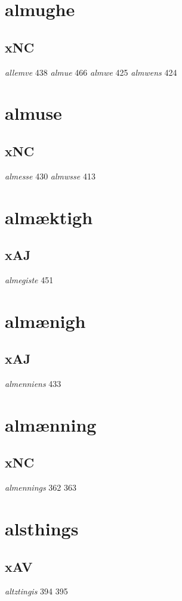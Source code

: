 \documentclass[a4paper,twocolumn]{article}
\begin{document}
\section{almughe}
\label{sec:org00c62bd}
\subsection{xNC}
\label{sec:org7449dd7}
\emph{allemve} 438 \emph{almue} 466 \emph{almwe} 425 \emph{almwens} 424 
\section{almuse}
\label{sec:orgfaaedbb}
\subsection{xNC}
\label{sec:org381f59d}
\emph{almesse} 430 \emph{almwsse} 413 
\section{almæktigh}
\label{sec:orgd04e793}
\subsection{xAJ}
\label{sec:org5886e8b}
\emph{almegiste} 451 
\section{almænigh}
\label{sec:org3bd0f0b}
\subsection{xAJ}
\label{sec:orge5a4e5b}
\emph{almenniens} 433 
\section{almænning}
\label{sec:orgab82732}
\subsection{xNC}
\label{sec:orgb20df10}
\emph{almennings} 362 363 
\section{alsthings}
\label{sec:org699112e}
\subsection{xAV}
\label{sec:org9fa0952}
\emph{altztingis} 394 395 
\end{document}
